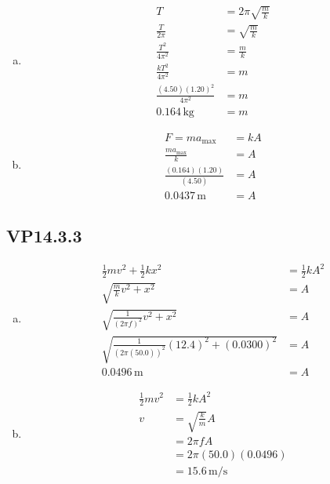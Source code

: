 \documentclass{article}
\begin{document}
\begin{enumerate}[a)]
  \item
        \begin{align*}
          T                             & = 2\pi\sqrt{\frac{m}{k}} \\
          \frac{T}{2\pi}                & = \sqrt{\frac{m}{k}}     \\
          \frac{T^2}{4\pi^2}            & = \frac{m}{k}            \\
          \frac{kT^2}{4\pi^2}           & = m                      \\
          \frac{(4.50)(1.20)^2}{4\pi^2} & = m                      \\
          0.164\,\textrm{kg}            & = m
        \end{align*}

  \item
        \begin{align*}
          F = ma_\textrm{max}          & = kA \\
          \frac{ma_\textrm{max}}{k}    & = A  \\
          \frac{(0.164)(1.20)}{(4.50)} & = A  \\
          0.0437\,\textrm{m}           & = A
        \end{align*}
\end{enumerate}

\subsection{VP14.3.3}

\begin{enumerate}[a)]
  \item
        \begin{align*}
          \frac{1}{2}mv^2 + \frac{1}{2}kx^2                  & = \frac{1}{2}kA^2 \\
          \sqrt{\frac{m}{k}v^2 + x^2}                        & = A               \\
          \sqrt{\frac{1}{(2\pi f)^2}v^2 + x^2}               & = A               \\
          \sqrt{\frac{1}{(2\pi(50.0))^2}(12.4)^2+(0.0300)^2} & = A               \\
          0.0496\,\textrm{m}                                 & = A
        \end{align*}

  \item
        \begin{align*}
          \frac{1}{2}mv^2 & = \frac{1}{2}kA^2     \\
          v               & = \sqrt{\frac{k}{m}}A \\
                          & = 2\pi fA             \\
                          & = 2\pi(50.0)(0.0496)  \\
                          & = 15.6\,\textrm{m/s}
        \end{align*}
\end{enumerate}
\end{document}
